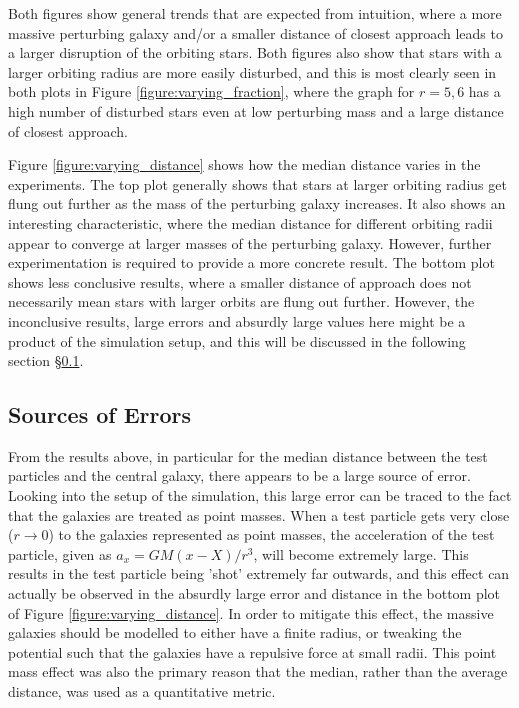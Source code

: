 \documentclass[twoside,twocolumn]{article}
\begin{document}
        Both figures show general trends that are expected from intuition, where a more massive perturbing galaxy and/or a smaller distance of closest approach leads to a larger disruption of the orbiting stars. Both figures also show that stars with a larger orbiting radius are more easily disturbed, and this is most clearly seen in both plots in Figure \ref{figure:varying_fraction}, where the graph for $r = 5, 6$ has a high number of disturbed stars even at low perturbing mass and a large distance of closest approach. 
        
        Figure \ref{figure:varying_distance} shows how the median distance varies in the experiments. The top plot generally shows that stars at larger orbiting radius get flung out further as the mass of the perturbing galaxy increases. It also shows an interesting characteristic, where the median distance for different orbiting radii appear to converge at larger masses of the perturbing galaxy. However, further experimentation is required to provide a more concrete result. The bottom plot shows less conclusive results, where a smaller distance of approach does not necessarily mean stars with larger orbits are flung out further. However, the inconclusive results, large errors and absurdly large values here might be a product of the simulation setup, and this will be discussed in the following section \S \ref{section:error}.  
        
         
    \subsection{Sources of Errors}
        \label{section:error}

        From the results above, in particular for the median distance between the test particles and the central galaxy, there appears to be a large source of error. Looking into the setup of the simulation, this large error can be traced to the fact that the galaxies are treated as point masses. When a test particle gets very close ($r \to 0$) to the galaxies represented as point masses, the acceleration of the test particle, given as $a_{x} = GM(x - X) / r^3$, will become extremely large. This results in the test particle being 'shot' extremely far outwards, and this effect can actually be observed in the absurdly large error and distance in the bottom plot of Figure \ref{figure:varying_distance}. In order to mitigate this effect, the massive galaxies should be modelled to either have a finite radius, or tweaking the potential such that the galaxies have a repulsive force at small radii. This point mass effect was also the primary reason that the median, rather than the average distance, was used as a quantitative metric. 
\end{document}
